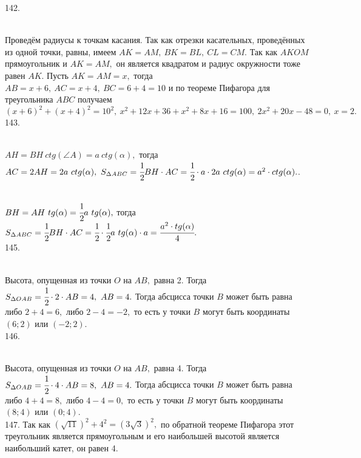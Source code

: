 142. \begin{figure}[ht!]
\end{figure}\\
Проведём радиусы к точкам касания. Так как отрезки касательных, проведённых из одной точки, равны, имеем $AK=AM,\ BK=BL,\ CL=CM.$ Так как $AKOM$ прямоугольник и $AK=AM,$ он является квадратом и радиус окружности тоже равен $AK.$ Пусть $AK=AM=x,$ тогда $AB=x+6,\ AC=x+4,\ BC=6+4=10$ и по теореме Пифагора для треугольника $ABC$ получаем $(x+6)^2+(x+4)^2=10^2,\ x^2+12x+36+x^2+8x+16=100,\ 2x^2+20x-48=0,\ x=2.$\\
143. \begin{figure}[ht!]
\end{figure}\\
$AH=BH\ ctg(\angle A)=a\ ctg(\alpha),$ тогда $AC=2AH=2a\ ctg(\alpha),\ S_{\Delta ABC}=\cfrac{1}{2}BH\cdot AC=\cfrac{1}{2}\cdot a \cdot2a\ ctg(\alpha)=a^2\cdot ctg(\alpha).$\newpage{}. \begin{figure}[ht!]
\end{figure}\\
$BH=AH\ tg(\alpha)=\cfrac{1}{2}a\ tg(\alpha),$ тогда $S_{\Delta ABC}=\cfrac{1}{2}BH\cdot AC=\cfrac{1}{2}\cdot \cfrac{1}{2}a\ tg(\alpha)\cdot a=\cfrac{a^2\cdot tg(\alpha)}{4}.$\\
145. \begin{figure}[ht!]
\end{figure}\\
Высота, опущенная из точки $O$ на $AB,$ равна 2. Тогда $S_{\Delta OAB}=\cfrac{1}{2}\cdot 2 \cdot AB=4,\ AB=4.$ Тогда абсцисса точки $B$ может быть равна либо $2+4=6,$ либо $2-4=-2,$ то есть у точки $B$ могут быть координаты $(6;2)$ или $(-2;2).$\\
146. \begin{figure}[ht!]
\end{figure}\\
Высота, опущенная из точки $O$ на $AB,$ равна 4. Тогда $S_{\Delta OAB}=\cfrac{1}{2}\cdot 4 \cdot AB=8,\ AB=4.$ Тогда абсцисса точки $B$ может быть равна либо $4+4=8,$ либо $4-4=0,$ то есть у точки $B$ могут быть координаты $(8;4)$ или $(0;4).$\\
147. Так как $(\sqrt{11})^2+4^2=(3\sqrt{3})^2,$ по обратной теореме Пифагора этот треугольник является прямоугольным и его наибольшей высотой является наибольший катет, он равен 4.\\
